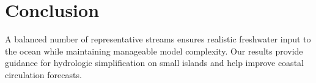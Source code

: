 \section{Conclusion}
A balanced number of representative streams ensures realistic freshwater input to the ocean while maintaining manageable model complexity. Our results provide guidance for hydrologic simplification on small islands and help improve coastal circulation forecasts.
